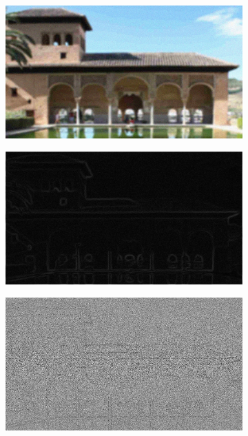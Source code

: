 \begin{figure}
\begin{subfigure}[b]{0.3\textwidth}
         \caption{}
         \label{}
     \end{subfigure}
     \\
     \begin{subfigure}[b]{0.3\textwidth}
         \centering
         \includegraphics[width=\textwidth]{./figs/img234}
         \caption{}
         \label{}
     \end{subfigure}
     \hfill
     \begin{subfigure}[b]{0.3\textwidth}
         \centering
         \includegraphics[width=\textwidth]{./figs/gradientMap3}
         \caption{}
         \label{}
     \end{subfigure}
     \hfill
     \begin{subfigure}[b]{0.3\textwidth}
         \centering
         \includegraphics[width=\textwidth]{./figs/lbp_gradient3}

\end{subfigure}
\end{figure}
